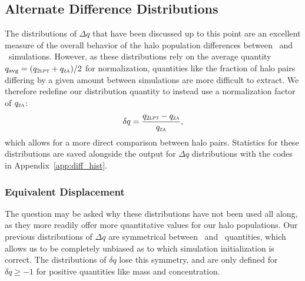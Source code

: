\subsection{Alternate Difference Distributions}
\label{subsec:analysis--alt_diff_dist}


The distributions of $\Delta q$ that have been discussed up to this point are an excellent measure of the overall behavior of the halo population differences between \lpt\ and \za\ simulations.  However, as these distributions rely on the average quantity $q_{\mathrm{avg}} = (q_{\textsc{2lpt}} + q_{\textsc{za}}) / 2$ for normalization, quantities like the fraction of halo pairs differing by a given amount between simulations are more difficult to extract.  We therefore redefine our distribution quantity to instead use a normalization factor of $q_{\textsc{za}}$:
\begin{equation} \label{eq:analysis--delta_prime_q}
	\delta q = \frac{q_{\textsc{2lpt}} - q_{\textsc{za}}}{q_{\textsc{za}}},
\end{equation}
which allows for a more direct comparison between halo pairs.  Statistics for these distributions are saved alongside the output for $\Delta q$ distributions with the codes in Appendix~\ref{app:diff_hist}.



\subsubsection{Equivalent Displacement}
\label{subsubsec:analysis--alt_diff_dist--equiv_displacment}


The question may be asked why these distributions have not been used all along, as they more readily offer more quantitative values for our halo populations.  Our previous distributions of $\Delta q$ are symmetrical between \lpt\ and \za\ quantities, which allows us to be completely unbiased as to which simulation initialization is correct.  The distributions of $\delta q$ lose this symmetry, and are only defined for $\delta q \geq -1$ for positive quantities like mass and concentration.

